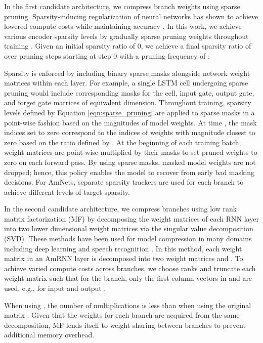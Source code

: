 \documentclass[a4paper]{article}
\begin{document}
In the first candidate architecture, we compress branch weights using sparse pruning. Sparsity-inducing regularization of neural networks has shown to achieve lowered compute costs while maintaining accuracy \cite{Wu2020-Sparsity, Hastie2015, Zhou2019, Gale2019, Hebiri2020}. In this work, we achieve various encoder sparsity levels by gradually sparse pruning weights throughout training \cite{Zhu2018}. Given an initial sparsity ratio of 0, we achieve a final sparsity ratio of  over  pruning steps starting at step 0 with a pruning frequency of :
\noindent

\noindent
Sparsity is enforced by including binary sparse masks alongside network weight matrices within each layer. 
For example, a single LSTM cell undergoing sparse pruning would include corresponding masks for the cell, input gate, output gate, and forget gate matrices of equivalent dimension. 
Throughout training, sparsity levels defined by Equation \ref{eqn:sparse_pruning} are applied to sparse masks in a point-wise fashion based on the magnitudes of model weights. 
At time , the mask indices set to zero correspond to the indices of weights with magnitude closest to zero based on the ratio defined by . 
At the beginning of each training batch, weight matrices are point-wise multiplied by their masks to set pruned weights to zero on each forward pass. 
By using sparse masks, masked model weights are not dropped; hence, this policy enables the model to recover from early bad masking decisions.
For AmNets, separate sparsity trackers are used for each branch to achieve different levels of target sparsity.

In the second candidate architecture, we compress branches using low rank matrix factorization (MF) by decomposing the weight matrices of each RNN layer into two lower dimensional weight matrices via the singular value decomposition (SVD). These methods have been used for model compression in many domains \cite{Andrews1976,Aharon2006,Rufai2014,McGivney2014} including deep learning and speech recognition \cite{Prabhavalkar2016,Kim2019,Swaminathan2020}. In this method, each weight matrix  in an AmRNN layer is decomposed into two weight matrices  and . To achieve varied compute costs across branches, we choose ranks  and truncate each weight matrix such that for the  branch, only the first  column vectors in  and  are used, e.g., for input  and output ,
\noindent

\noindent
When using , the number of multiplications is less than when using the original matrix .
Given that the weights for each branch are acquired from the same decomposition, MF lends itself to weight sharing between branches to prevent additional memory overhead.
\end{document}
